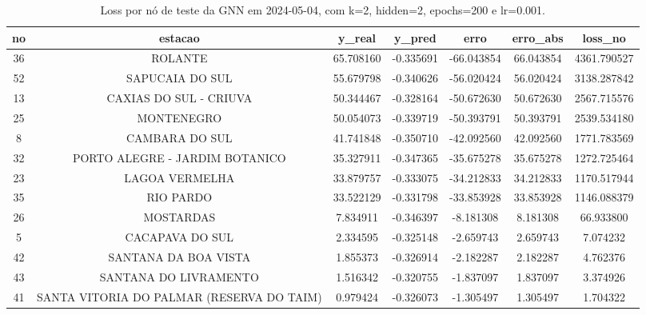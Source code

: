 \begin{table}[h]
\centering
\caption{Loss por nó de teste da GNN em 2024-05-04, com k=2, hidden=2, epochs=200 e lr=0.001.}
\label{tab:gnn_loss_nodes_k2_hidden2}
\begin{tabular}{ccccccc}
\toprule
no & estacao & y\_real & y\_pred & erro & erro\_abs & loss\_no \\
\midrule
36 & ROLANTE & 65.708160 & -0.335691 & -66.043854 & 66.043854 & 4361.790527 \\
52 & SAPUCAIA DO SUL & 55.679798 & -0.340626 & -56.020424 & 56.020424 & 3138.287842 \\
13 & CAXIAS DO SUL - CRIUVA & 50.344467 & -0.328164 & -50.672630 & 50.672630 & 2567.715576 \\
25 & MONTENEGRO & 50.054073 & -0.339719 & -50.393791 & 50.393791 & 2539.534180 \\
8 & CAMBARA DO SUL & 41.741848 & -0.350710 & -42.092560 & 42.092560 & 1771.783569 \\
32 & PORTO ALEGRE - JARDIM BOTANICO & 35.327911 & -0.347365 & -35.675278 & 35.675278 & 1272.725464 \\
23 & LAGOA VERMELHA & 33.879757 & -0.333075 & -34.212833 & 34.212833 & 1170.517944 \\
35 & RIO PARDO & 33.522129 & -0.331798 & -33.853928 & 33.853928 & 1146.088379 \\
26 & MOSTARDAS & 7.834911 & -0.346397 & -8.181308 & 8.181308 & 66.933800 \\
5 & CACAPAVA DO SUL & 2.334595 & -0.325148 & -2.659743 & 2.659743 & 7.074232 \\
42 & SANTANA DA BOA VISTA & 1.855373 & -0.326914 & -2.182287 & 2.182287 & 4.762376 \\
43 & SANTANA DO LIVRAMENTO & 1.516342 & -0.320755 & -1.837097 & 1.837097 & 3.374926 \\
41 & SANTA VITORIA DO PALMAR (RESERVA DO TAIM) & 0.979424 & -0.326073 & -1.305497 & 1.305497 & 1.704322 \\
\bottomrule
\end{tabular}
\end{table}
